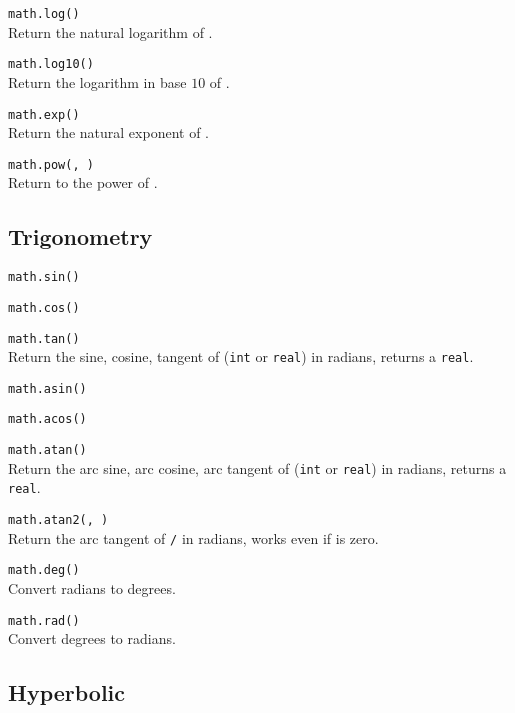 \hangpar \texttt{math.log(}\texttt{)}\\
Return the natural logarithm of .

\hangpar \texttt{math.log10(}\texttt{)}\\
Return the logarithm in base $10$ of .

\hangpar \texttt{math.exp(}\texttt{)}\\
Return the natural exponent of .

\hangpar \texttt{math.pow(}\texttt{, }\texttt{)}\\
Return  to the power of .


\subsection*{Trigonometry}

\hangpar \texttt{math.sin(}\texttt{)}

\hangpar \texttt{math.cos(}\texttt{)}

\hangpar \texttt{math.tan(}\texttt{)}\\
Return the sine, cosine, tangent of  (\texttt{int} or \texttt{real}) in radians, returns a \texttt{real}.

\hangpar \texttt{math.asin(}\texttt{)}

\hangpar \texttt{math.acos(}\texttt{)}

\hangpar \texttt{math.atan(}\texttt{)}\\
Return the arc sine, arc cosine, arc tangent of  (\texttt{int} or \texttt{real}) in radians, returns a \texttt{real}.

\hangpar \texttt{math.atan2(}\texttt{, }\texttt{)}\\
Return the arc tangent of  \texttt{/}  in radians, works even if  is zero.

\hangpar \texttt{math.deg(}\texttt{)}\\
Convert radians to degrees.

\hangpar \texttt{math.rad(}\texttt{)}\\
Convert degrees to radians.

\subsection*{Hyperbolic}

